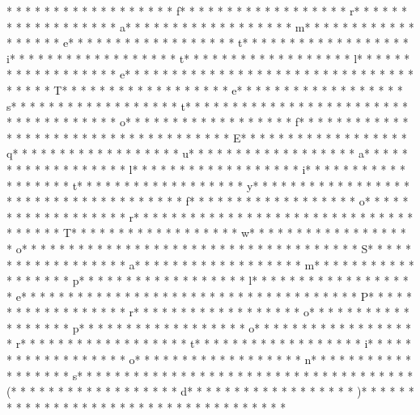 * * *  * * *  * * *  *  * * *  *  * * *  * f* * *  * * *  * * *  *  * * *  *  * * *  * r* * *  * * *  * * *  *  * * *  *  * * *  * a* * *  * * *  * * *  *  * * *  *  * * *  * m* * *  * * *  * * *  *  * * *  *  * * *  * e* * *  * * *  * * *  *  * * *  *  * * *  * t* * *  * * *  * * *  *  * * *  *  * * *  * i* * *  * * *  * * *  *  * * *  *  * * *  * t* * *  * * *  * * *  *  * * *  *  * * *  * l* * *  * * *  * * *  *  * * *  *  * * *  * e* * *  * * *  * * *  *  * * *  *  * * *  * {* * *  * * *  * * *  *  * * *  *  * * *  * T* * *  * * *  * * *  *  * * *  *  * * *  * e* * *  * * *  * * *  *  * * *  *  * * *  * s* * *  * * *  * * *  *  * * *  *  * * *  * t* * *  * * *  * * *  *  * * *  *  * * *  *  * * *  * * *  * * *  *  * * *  *  * * *  * o* * *  * * *  * * *  *  * * *  *  * * *  * f* * *  * * *  * * *  *  * * *  *  * * *  *  * * *  * * *  * * *  *  * * *  *  * * *  * E* * *  * * *  * * *  *  * * *  *  * * *  * q* * *  * * *  * * *  *  * * *  *  * * *  * u* * *  * * *  * * *  *  * * *  *  * * *  * a* * *  * * *  * * *  *  * * *  *  * * *  * l* * *  * * *  * * *  *  * * *  *  * * *  * i* * *  * * *  * * *  *  * * *  *  * * *  * t* * *  * * *  * * *  *  * * *  *  * * *  * y* * *  * * *  * * *  *  * * *  *  * * *  *  * * *  * * *  * * *  *  * * *  *  * * *  * f* * *  * * *  * * *  *  * * *  *  * * *  * o* * *  * * *  * * *  *  * * *  *  * * *  * r* * *  * * *  * * *  *  * * *  *  * * *  *  * * *  * * *  * * *  *  * * *  *  * * *  * T* * *  * * *  * * *  *  * * *  *  * * *  * w* * *  * * *  * * *  *  * * *  *  * * *  * o* * *  * * *  * * *  *  * * *  *  * * *  *  * * *  * * *  * * *  *  * * *  *  * * *  * S* * *  * * *  * * *  *  * * *  *  * * *  * a* * *  * * *  * * *  *  * * *  *  * * *  * m* * *  * * *  * * *  *  * * *  *  * * *  * p* * *  * * *  * * *  *  * * *  *  * * *  * l* * *  * * *  * * *  *  * * *  *  * * *  * e* * *  * * *  * * *  *  * * *  *  * * *  *  * * *  * * *  * * *  *  * * *  *  * * *  * P* * *  * * *  * * *  *  * * *  *  * * *  * r* * *  * * *  * * *  *  * * *  *  * * *  * o* * *  * * *  * * *  *  * * *  *  * * *  * p* * *  * * *  * * *  *  * * *  *  * * *  * o* * *  * * *  * * *  *  * * *  *  * * *  * r* * *  * * *  * * *  *  * * *  *  * * *  * t* * *  * * *  * * *  *  * * *  *  * * *  * i* * *  * * *  * * *  *  * * *  *  * * *  * o* * *  * * *  * * *  *  * * *  *  * * *  * n* * *  * * *  * * *  *  * * *  *  * * *  * s* * *  * * *  * * *  *  * * *  *  * * *  *  * * *  * * *  * * *  *  * * *  *  * * *  * (* * *  * * *  * * *  *  * * *  *  * * *  * d* * *  * * *  * * *  *  * * *  *  * * *  * )* * *  * * *  * * *  *  * * *  *  * * *  * }* * *  * * *  * * *  *  * * *  *  * * *  * 
